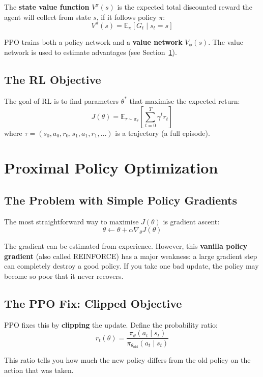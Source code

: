 \documentclass[12pt, a4paper]{article}
\begin{document}
The \textbf{state value function} $V^\pi(s)$ is the expected total discounted reward the agent will collect from state $s$, if it follows policy $\pi$:
\[
V^\pi(s) = \mathbb{E}_\pi \left[ G_t \mid s_t = s \right]
\]

PPO trains both a policy network and a \textbf{value network} $V_\phi(s)$. The value network is used to estimate advantages (see Section~\ref{sec:ppo}).

\subsection{The RL Objective}

The goal of RL is to find parameters $\theta^*$ that maximise the expected return:
\[
J(\theta) = \mathbb{E}_{\tau \sim \pi_\theta} \left[ \sum_{t=0}^{T} \gamma^t r_t \right]
\]
where $\tau = (s_0, a_0, r_0, s_1, a_1, r_1, \ldots)$ is a trajectory (a full episode).

\section{Proximal Policy Optimization}\label{sec:ppo}

\subsection{The Problem with Simple Policy Gradients}

The most straightforward way to maximise $J(\theta)$ is gradient ascent:
\[
\theta \leftarrow \theta + \alpha \nabla_\theta J(\theta)
\]

The gradient can be estimated from experience. However, this \textbf{vanilla policy gradient} (also called REINFORCE) has a major weakness: a large gradient step can completely destroy a good policy. If you take one bad update, the policy may become so poor that it never recovers.

\subsection{The PPO Fix: Clipped Objective}

PPO fixes this by \textbf{clipping} the update. Define the probability ratio:
\[
r_t(\theta) = \frac{\pi_\theta(a_t \mid s_t)}{\pi_{\theta_{\text{old}}}(a_t \mid s_t)}
\]

This ratio tells you how much the new policy differs from the old policy on the action that was taken.
\end{document}
